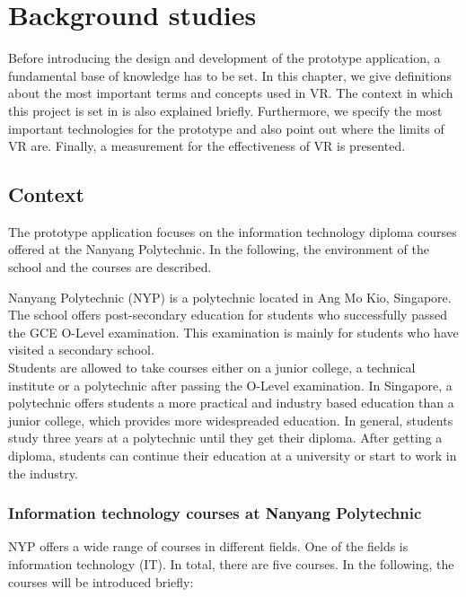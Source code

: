 \chapter{Background studies} \label{stateofarts}
Before introducing the design and development of the prototype application, a fundamental base of knowledge has to be set. In this chapter, we give definitions about the most important terms and concepts used in VR. The context in which this project is set in is also explained briefly. Furthermore, we specify the most important technologies for the prototype and also point out where the limits of VR are. Finally, a measurement for the effectiveness of VR is presented.

\section{Context}
The prototype application focuses on the information technology diploma courses offered at the Nanyang Polytechnic. In the following, the environment of the school and the courses are described.

Nanyang Polytechnic (NYP) is a polytechnic located in Ang Mo Kio, Singapore. The school offers post-secondary education for students who successfully passed the GCE O-Level examination. This examination is mainly for students who have visited a secondary school. \cite{aboutOLevel} \\ 
Students are allowed to take courses either on a junior college, a technical institute or a polytechnic after passing the O-Level examination. In Singapore, a polytechnic offers students a more practical and industry based education than a junior college, which provides more widespreaded education. In general, students study three years at a polytechnic until they get their diploma. After getting a diploma, students can continue their education at a university or start to work in the industry. \cite{schoolSystem}
\subsection{Information technology courses at Nanyang Polytechnic}
NYP offers a wide range of courses in different fields. One of the fields is information technology (IT). In total, there are five courses. In the following, the courses will be introduced briefly: \cite{nypCourses}

